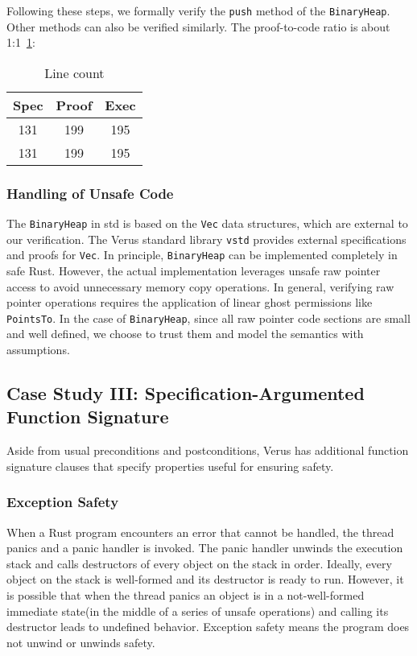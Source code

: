 \documentclass[conference]{IEEEtran}
\begin{document}
Following these steps, we formally verify the \texttt{push} method of the \texttt{BinaryHeap}. Other methods can also be verified similarly. The proof-to-code ratio is about 1:1~\ref{Line count}:

\begin{table}[h]
\centering
\begin{tabular}{|c|c|c|}
\hline
\textbf{Spec} & \textbf{Proof} & \textbf{Exec} \\
\hline
131 & 199 & 195 \\
\hline
131 & 199 & 195 \\
\hline
\end{tabular}
\caption{Line count}
\label{Line count}
\end{table}
\subsubsection{Handling of Unsafe Code}
The \texttt{BinaryHeap} in std is based on the \texttt{Vec} data structures, which are external to our verification. The Verus standard library \texttt{vstd} provides external specifications and proofs for \texttt{Vec}. In principle, \texttt{BinaryHeap} can be implemented completely in safe Rust. However, the actual implementation leverages unsafe raw pointer access to avoid unnecessary memory copy operations. In general, verifying raw pointer operations requires the application of linear ghost permissions like \texttt{PointsTo}. In the case of \texttt{BinaryHeap}, since all raw pointer code sections are small and well defined, we choose to trust them and model the semantics with assumptions. 

\subsection{Case Study III: Specification-Argumented Function Signature}
Aside from usual preconditions and postconditions, Verus has additional function signature clauses that specify properties useful for ensuring safety. 
\subsubsection{Exception Safety}
When a Rust program encounters an error that cannot be handled, the thread panics and a panic handler is invoked. The panic handler unwinds the execution stack and calls destructors of every object on the stack in order. Ideally, every object on the stack is well-formed and its destructor is ready to run. However, it is possible that when the thread panics an object is in a not-well-formed immediate state(in the middle of a series of unsafe operations) and calling its destructor leads to undefined behavior. Exception safety means the program does not unwind or unwinds safety.     
\end{document}
